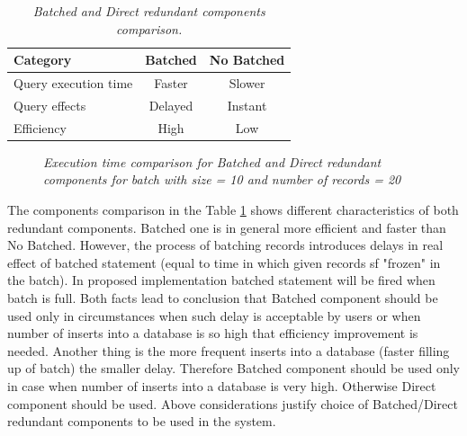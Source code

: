 \documentclass[12pt,a4paper]{article}
\begin{document}
\begin{table}[!htb]
\begin{center}
\begin{tabular}{l|c|c}
  \textbf{Category} &\textbf{Batched} & \textbf{No Batched} \\
\hline
Query execution time & Faster & Slower \\
Query effects & Delayed & Instant\\
Efficiency & High & Low\\
\end{tabular}
\end{center}
\caption{\textit{Batched and Direct redundant components comparison.}}\label{batchedcomponents}
\end{table}

\begin{figure}[!htb]
\centering
{}
\caption{\textit{Execution time comparison for Batched and Direct redundant components for batch with size = 10 and number of records = 20}} \label{fig:batchedtime}
\end{figure}

The components comparison in the Table \ref{batchedcomponents} shows different characteristics of both redundant components. Batched one is in general more efficient and faster than No Batched. However, the process of batching records introduces delays in real effect of batched statement (equal to time in which given records sf "frozen" in the batch). In proposed implementation batched statement will be fired when batch is full. Both facts lead to conclusion that Batched component should be used only in circumstances when such delay is acceptable by users or when number of inserts into a database is so high that efficiency improvement is needed. Another thing is the more frequent inserts into a database (faster filling up of batch) the smaller delay. Therefore Batched component should be used only in case when number of inserts into a database is very high. Otherwise Direct component should be used. Above considerations justify choice of Batched/Direct redundant components to be used in the system.   
\end{document}
